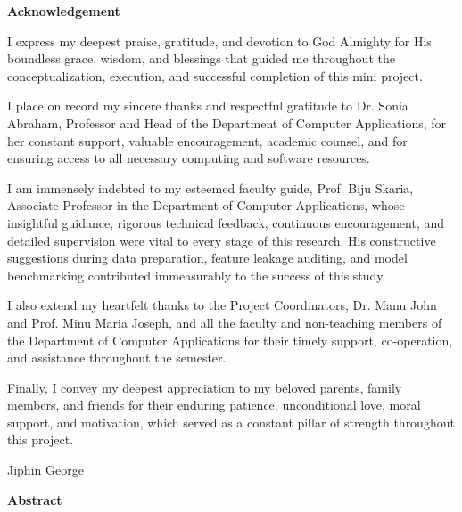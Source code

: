 \clearpage
{}
\setcounter{page}{1}
{}
\thispagestyle{plain}
\begin{center}
    \textbf{\Large Acknowledgement}
\end{center}
\vspace{0.4cm}

I express my deepest praise, gratitude, and devotion to God Almighty for His boundless grace, wisdom, and blessings that guided me throughout the conceptualization, execution, and successful completion of this mini project.

I place on record my sincere thanks and respectful gratitude to Dr. Sonia Abraham, Professor and Head of the Department of Computer Applications, for her constant support, valuable encouragement, academic counsel, and for ensuring access to all necessary computing and software resources.

I am immensely indebted to my esteemed faculty guide, Prof. Biju Skaria, Associate Professor in the Department of Computer Applications, whose insightful guidance, rigorous technical feedback, continuous encouragement, and detailed supervision were vital to every stage of this research. His constructive suggestions during data preparation, feature leakage auditing, and model benchmarking contributed immeasurably to the success of this study.

I also extend my heartfelt thanks to the Project Coordinators, Dr. Manu John and Prof. Minu Maria Joseph, and all the faculty and non-teaching members of the Department of Computer Applications for their timely support, co-operation, and assistance throughout the semester.

Finally, I convey my deepest appreciation to my beloved parents, family members, and friends for their enduring patience, unconditional love, moral support, and motivation, which served as a constant pillar of strength throughout this project.

\vspace{1.0cm}

\begin{flushright}
Jiphin George
\end{flushright}

\clearpage

{}
\thispagestyle{plain}
\begin{center}
    \textbf{\Large Abstract}
\end{center}
\vspace{0.4cm}

